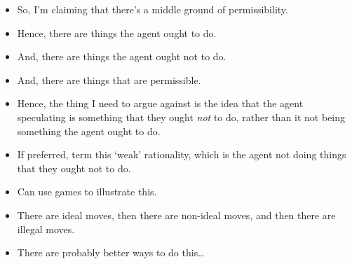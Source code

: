 \documentclass[10pt]{article}
\begin{document}
\begin{itemize}
\item So, I'm claiming that there's a middle ground of permissibility.
\item Hence, there are things the agent ought to do.
\item And, there are things the agent ought not to do.
\item And, there are things that are permissible.
\item Hence, the thing I need to argue against is the idea that the agent speculating is something that they ought \emph{not} to do, rather than it not being something the agent ought to do.
\end{itemize}

\begin{itemize}
\item If preferred, term this `weak' rationality, which is the agent not doing things that they ought not to do.
\item Can use games to illustrate this.
\item There are ideal moves, then there are non-ideal moves, and then there are illegal moves.
\item There are probably better ways to do this\dots
\end{itemize}
\end{document}
